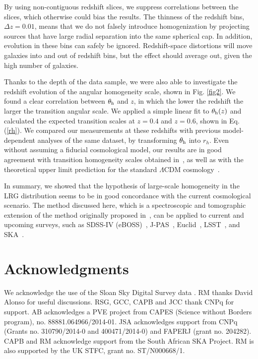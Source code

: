 \documentclass[useAMS,usenatbib]{mn2e}
\begin{document}
By using non-contiguous redshift slices, we suppress correlations between the slices, which otherwise could bias the results. The thinness of the redshift bins, $\Delta z=0.01$, means  that we do not falsely introduce homogenization by projecting sources that have large radial separation into the same spherical cap. In addition, evolution in these bins can safely be ignored. Redshift-space distortions will move galaxies into and out of redshift bins, but the effect should average out, given the high number of galaxies.

Thanks to the depth of the data sample, we were also able to investigate the redshift evolution of the angular homogeneity scale, shown in Fig. \ref{fig2}. We found a clear correlation between $\theta_{\rm h}$ and $z$, in which the lower the redshift the larger the transition angular scale. We applied a simple linear fit to $\theta_{\rm h}(z)$ and calculated the expected transition scales at $z = 0.4$ and $z = 0.6$, shown in Eq. (\ref{rh}). We compared our measurements at these redshifts with previous model-dependent analyses of the same dataset, by transforming $\theta_{\rm h}$ into $r_h$. Even without assuming a fiducial cosmological model, our results are in good agreement with transition homogeneity scales obtained in~\cite{pandey15, ntelis17}, as well as with the theoretical upper limit prediction for the standard $\Lambda$CDM cosmology~\citep{yadav10}. 

In summary, we showed that the hypothesis of large-scale homogeneity in the LRG distribution seems to be in good concordance with the current cosmological scenario. The method discussed here, which is a spectroscopic and tomographic extension of the method originally proposed in~\cite{alonso14}, can be applied to current and upcoming surveys, such as SDSS-IV (eBOSS)~\citep{eboss16}, J-PAS~\citep{jpas14}, Euclid~\citep{euclid16}, LSST~\citep{lsst09}, and SKA~\citep{ska15}. \\

\section*{Acknowledgments}

We acknowledge the use of the Sloan Sky Digital Survey data \citep{york00}. RM thanks David Alonso for useful discussions. RSG, GCC, CAPB and JCC thank CNPq for support. AB acknowledges a PVE project from CAPES (Science without Borders program), no. 88881.064966/2014-01. JSA acknowledges support from CNPq (Grants no. 310790/2014-0 and 400471/2014-0) and FAPERJ (grant no. 204282). CAPB and RM acknowledge support from the South African SKA Project. RM is also supported by the UK STFC, grant no. ST/N000668/1.
\end{document}
